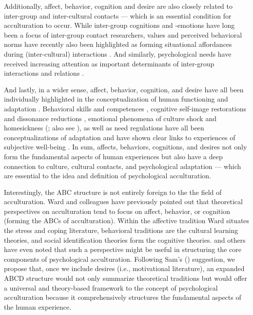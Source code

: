 \documentclass[man, 12pt, a4paper]{apa7}
\begin{document}
Additionally, affect, behavior, cognition and desire are also closely related to inter-group and inter-cultural contacts --- which is an essential condition for acculturation to occur. While inter-group cognitions \citep[e.g.,][]{Stephan2000a} and -emotions \citep[e.g.,][]{Iyer2008, Stephan1992} have long been a focus of inter-group contact researchers, values and perceived behavioral norms have recently also been highlighted as forming situational affordances during (inter-cultural) interactions \citep[e.g.,][]{Ramstead2016, Maxwell2017, Sam2010}. And similarly, psychological needs have received increasing attention as important determinants of inter-group interactions and relations \citep[e.g.,][]{Dovidio2017, Kitayama2007, Hassler2021, Shnabel2008a}.

And lastly, in a wider sense, affect, behavior, cognition, and desire have all been individually highlighted in the conceptualization of human functioning and adaptation \citep[a core outcome for many acculturation researchers; e.g.,][]{Berry2006a,Searle1990,Ward2001,Maertz2016}. Behavioral skills and competences \citep[e.g.,][]{Bevan1965}, cognitive self-image restorations and dissonance reductions \citep[e.g.,][]{Czajkowska2017}, emotional phenomena of culture shock \citep{Ward2001a} and homesickness (\citealp{VanTilburg1996}; also see \citealp{Smith1990, Pacella2017}), as well as need regulations \citep[e.g.,][]{Steverink2006, Dignath2020} have all been conceptualizations of adaptation and have shown clear links to experiences of subjective well-being \citep[e.g.,][]{Luhmann2012}. In sum, affects, behaviors, cognitions, and desires not only form the fundamental aspects of human experiences but also have a deep connection to culture, cultural contacts, and psychological adaptation --- which are essential to the idea and definition of psychological acculturation.

Interestingly, the ABC structure is not entirely foreign to the the field of acculturation. Ward and colleagues \citep{Ward2001, Masgoret2006, Ward2019} have previously pointed out that theoretical perspectives on acculturation tend to focus on affect, behavior, or cognition (forming the ABCs of acculturation). Within the affective tradition Ward situates the stress and coping literature, behavioral traditions are the cultural learning theories, and social identification theories form the cognitive theories. \citet{Sam2006b} and others have even noted that such a perspective might be useful in structuring the core components of psychological acculturation. 
Following Sam's (\citeyear{Sam2006b}) suggestion, we propose that, once we include desires (i.e., motivational literature), an expanded ABCD structure would not only summarize theoretical traditions but would offer a universal and theory-based framework to the concept of psychological acculturation because it comprehensively structures the fundamental aspects of the human experience.
\end{document}
